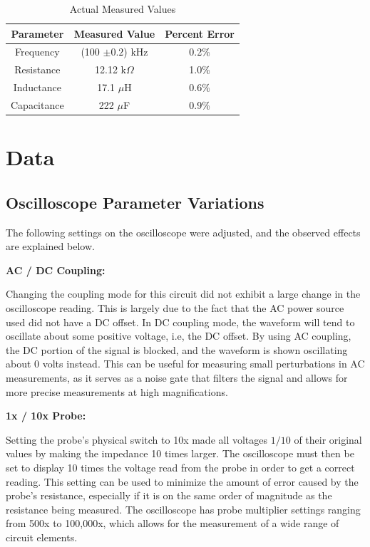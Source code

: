 \documentclass[twocolumn,english]{IEEEtran}
\theoremstyle{plain}
\theoremstyle{plain}
\begin{document}
\begin{table}[h!]
\centering{}
\caption{Actual Measured Values}
\label{tb:parameter_error}
\begin{tabular}{|c|c|c|}
\hline
\textbf{Parameter}	&\textbf{Measured Value}	&\textbf{Percent Error}	\\ \hline
Frequency		& (100 $\pm 0.2$) kHz		&0.2\%		\\ \hline
{Resistance}		& 12.12 k$\Omega$  		&1.0\% 		\\ \hline
{Inductance}		& 17.1 $\mu$H   		&0.6\% 		\\ \hline
{Capacitance}		& 222 $\mu$F  			&0.9\%		\\ \hline
\end{tabular}
\end{table}

\section{Data}
\subsection{Oscilloscope Parameter Variations}
The following settings on the oscilloscope were adjusted, and the observed effects are explained below.

\noindent\textbf{AC / DC Coupling: }

Changing the coupling mode for this circuit did not exhibit a large change in the oscilloscope reading. This is largely due to the fact that the AC power source used did not have a DC offset. In DC coupling mode, the waveform will tend to oscillate about some positive voltage, i.e, the DC offset. By using AC coupling, the DC portion of the signal is blocked, and the waveform is shown oscillating about 0 volts instead. This can be useful for measuring small perturbations in AC measurements, as it serves as a noise gate that filters the signal and allows for more precise measurements at high magnifications.

\noindent\textbf{1x / 10x Probe: }

Setting the probe's physical switch to 10x made all voltages $1/10$ of their original values by making the impedance 10 times larger. The oscilloscope must then be set to display 10 times the voltage read from the probe in order to get a correct reading. This setting can be used to minimize the amount of error caused by the probe's resistance, especially if it is on the same order of magnitude as the resistance being measured. The oscilloscope has probe multiplier settings ranging from 500x to 100,000x, which allows for the measurement of a wide range of circuit elements.
\end{document}
